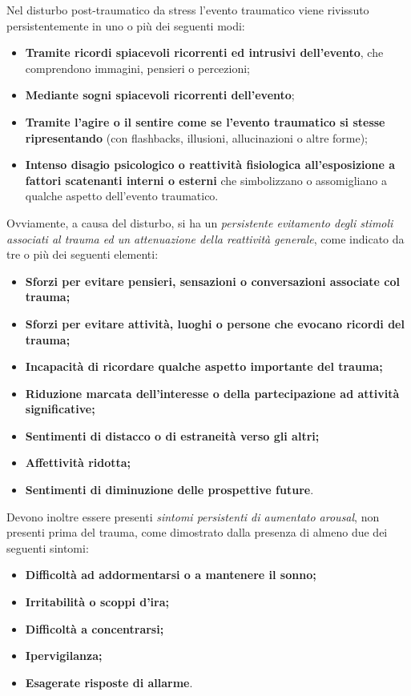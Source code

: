 Nel disturbo post-traumatico da stress l'evento traumatico viene
rivissuto persistentemente in uno o più dei seguenti modi:

\begin{itemize}
\item
  \textbf{Tramite ricordi spiacevoli ricorrenti ed intrusivi
  dell'evento}, che comprendono immagini, pensieri o percezioni;
\item
  \textbf{Mediante sogni spiacevoli ricorrenti dell'evento};
\item
  \textbf{Tramite l'agire o il sentire come se l'evento traumatico si
  stesse ripresentando} (con flashbacks, illusioni, allucinazioni o
  altre forme);
\item
  \textbf{Intenso disagio psicologico o reattività fisiologica
  all'esposizione a fattori scatenanti interni o esterni} che
  simbolizzano o assomigliano a qualche aspetto dell'evento traumatico.
\end{itemize}

Ovviamente, a causa del disturbo, si ha un \emph{persistente evitamento
degli stimoli associati al trauma ed un attenuazione della reattività
generale}, come indicato da tre o più dei seguenti elementi:

\begin{itemize}
\item
  \textbf{Sforzi per evitare pensieri, sensazioni o conversazioni
  associate col trauma;}
\item
  \textbf{Sforzi per evitare attività, luoghi o persone che evocano
  ricordi del trauma;}
\item
  \textbf{Incapacità di ricordare qualche aspetto importante del
  trauma;}
\item
  \textbf{Riduzione marcata dell'interesse o della partecipazione ad
  attività significative;}
\item
  \textbf{Sentimenti di distacco o di estraneità verso gli altri;}
\item
  \textbf{Affettività ridotta;}
\item
  \textbf{Sentimenti di diminuzione delle prospettive future}.
\end{itemize}

Devono inoltre essere presenti \emph{sintomi persistenti di aumentato
arousal}, non presenti prima del trauma, come dimostrato dalla presenza
di almeno due dei seguenti sintomi:

\begin{itemize}
\item
  \textbf{Difficoltà ad addormentarsi o a mantenere il sonno;}
\item
  \textbf{Irritabilità o scoppi d'ira;}
\item
  \textbf{Difficoltà a concentrarsi;}
\item
  \textbf{Ipervigilanza;}
\item
  \textbf{Esagerate risposte di allarme}.
\end{itemize}

